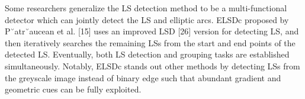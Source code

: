 \documentclass[a4paper]{report}
\begin{document}
Some researchers generalize the LS detection method to be
a multi-functional detector which can jointly detect the LS
and elliptic arcs. ELSDc proposed by P˘atr˘aucean et al. [15]
uses an improved LSD [26] version for detecting LS, and
then iteratively searches the remaining LSs from the start and
end points of the detected LS. Eventually, both LS detection
and grouping tasks are established simultaneously. Notably,
ELSDc stands out other methods by detecting LSs from the
greyscale image instead of binary edge such that abundant
gradient and geometric cues can be fully exploited.

 

\end{document}
